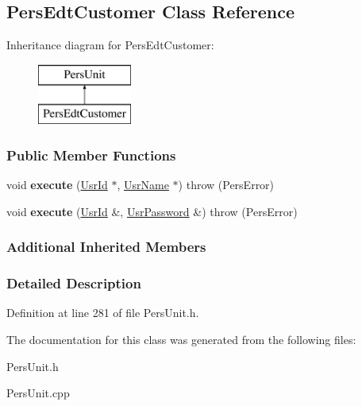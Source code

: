 \hypertarget{classPersEdtCustomer}{\subsection{Pers\-Edt\-Customer Class Reference}
\label{de/d6a/classPersEdtCustomer}
}
Inheritance diagram for Pers\-Edt\-Customer\-:\begin{figure}[H]
\begin{center}
\leavevmode
\includegraphics[height=2.000000cm]{de/d6a/classPersEdtCustomer}
\end{center}
\end{figure}
\subsubsection*{Public Member Functions}
\begin{DoxyCompactItemize}
\item 
\hypertarget{classPersEdtCustomer_a5275d925c901c95fbeb2036cd5c8e91e}{void {\bfseries execute} (\hyperlink{classUsrId}{Usr\-Id} $\ast$, \hyperlink{classUsrName}{Usr\-Name} $\ast$)  throw (\-Pers\-Error)}\label{de/d6a/classPersEdtCustomer_a5275d925c901c95fbeb2036cd5c8e91e}

\item 
\hypertarget{classPersEdtCustomer_a317d8e46e20e7bf342125dc6fda3adb9}{void {\bfseries execute} (\hyperlink{classUsrId}{Usr\-Id} \&, \hyperlink{classUsrPassword}{Usr\-Password} \&)  throw (\-Pers\-Error)}\label{de/d6a/classPersEdtCustomer_a317d8e46e20e7bf342125dc6fda3adb9}

\end{DoxyCompactItemize}
\subsubsection*{Additional Inherited Members}


\subsubsection{Detailed Description}


Definition at line 281 of file Pers\-Unit.\-h.



The documentation for this class was generated from the following files\-:\begin{DoxyCompactItemize}
\item 
Pers\-Unit.\-h\item 
Pers\-Unit.\-cpp\end{DoxyCompactItemize}
